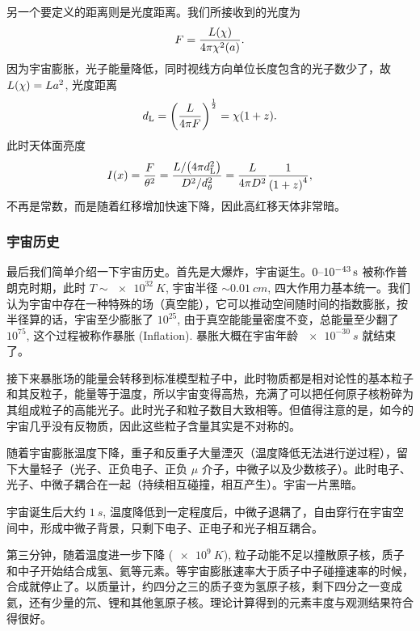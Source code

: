 \documentclass[../天体物理基础.tex]{subfiles}
\begin{document}
另一个要定义的距离则是光度距离。我们所接收到的光度为
\begin{equation}
F=\frac{L\mleft(\chi\mright)}{4\pi \chi^{2}\mleft(a\mright)}.
\end{equation}
因为宇宙膨胀，光子能量降低，同时视线方向单位长度包含的光子数少了，故 $L\mleft(\chi\mright)=La^{2}$, 光度距离
\begin{equation}
d_{\mathrm{L}}=\mleft(\frac{L}{4\pi F}\mright)^{\frac{1}{2}}=\chi\mleft(1+z\mright).
\end{equation}
此时天体面亮度
\begin{equation}
I\mleft(x\mright)=\frac{F}{\theta^{2}}=\frac{L/\mleft(4\pi d_{\mathrm{L}}^{2}\mright)}{D^{2}/d_{\theta}^{2}}=\frac{L}{4\pi D^{2}}\frac{1}{\mleft(1+z\mright)^{4}},
\end{equation}
不再是常数，而是随着红移增加快速下降，因此高红移天体非常暗。

\subsubsection{宇宙历史}
最后我们简单介绍一下宇宙历史。首先是大爆炸，宇宙诞生。$0\text{\textendash}\qty{e-43}{s}$ 被称作普朗克时期，此时 $T\sim\qty{e32}{K}$, 宇宙半径 $\sim\qty{0.01}{cm}$, 四大作用力基本统一。我们认为宇宙中存在一种特殊的场（真空能），它可以推动空间随时间的指数膨胀，按半径算的话，宇宙至少膨胀了 $10^{25}$, 由于真空能能量密度不变，总能量至少翻了 $10^{75}$, 这个过程被称作暴胀 (Inflation). 暴胀大概在宇宙年龄 $\qty{e-30}{s}$ 就结束了。

接下来暴胀场的能量会转移到标准模型粒子中，此时物质都是相对论性的基本粒子和其反粒子，能量等于温度，所以宇宙变得高热，充满了可以把任何原子核粉碎为其组成粒子的高能光子。此时光子和粒子数目大致相等。但值得注意的是，如今的宇宙几乎没有反物质，因此这些粒子含量其实是不对称的。

随着宇宙膨胀温度下降，重子和反重子大量湮灭（温度降低无法进行逆过程），留下大量轻子（光子、正负电子、正负 $\mu$ 介子，中微子以及少数核子）。此时电子、光子、中微子耦合在一起（持续相互碰撞，相互产生）。宇宙一片黑暗。

宇宙诞生后大约 $\qty{1}{s}$, 温度降低到一定程度后，中微子退耦了，自由穿行在宇宙空间中，形成中微子背景，只剩下电子、正电子和光子相互耦合。

第三分钟，随着温度进一步下降 ($\qty{e9}{K}$), 粒子动能不足以撞散原子核，质子和中子开始结合成氢、氦等元素。等宇宙膨胀速率大于质子中子碰撞速率的时候，合成就停止了。以质量计，约四分之三的质子变为氢原子核，剩下四分之一变成氦，还有少量的氘、锂和其他氢原子核。理论计算得到的元素丰度与观测结果符合得很好。
\end{document}
